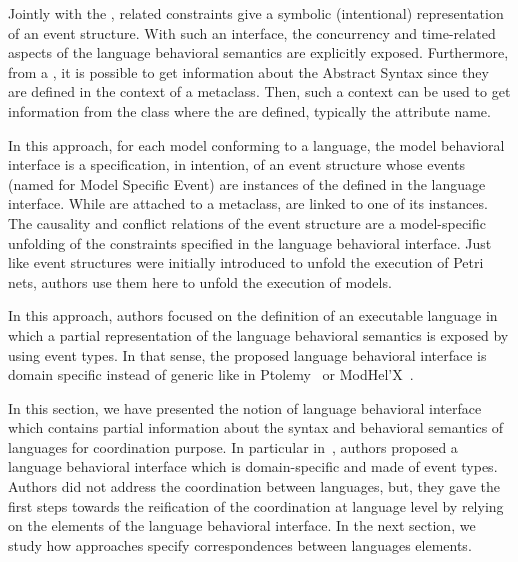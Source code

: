 Jointly with the \dse, related constraints give a symbolic (intentional) representation of an event structure. With such an interface, the concurrency and time-related aspects of the language behavioral semantics are explicitly exposed. Furthermore, from a \dse, it is possible to get information about the Abstract Syntax since they are defined in the context of a metaclass. Then, such a context can be used to get information from the class where the \dse are defined, typically the attribute name.   

In this approach, for each model conforming to a language, the model behavioral interface is a specification, in intention, of an event structure whose events (named \mse for Model Specific Event) are instances of the \dse defined in the language interface. While \dse are attached to a metaclass, \mse are linked to one of its instances. The causality and conflict relations of the event structure are a model-specific unfolding of the constraints specified in the language behavioral interface. Just like event structures were initially introduced to unfold the execution of Petri nets, authors use them here to unfold the execution of models. 

In this approach, authors focused on the definition of an executable language in which a partial representation of the language behavioral semantics is exposed by using event types. In that sense, the proposed language behavioral interface is domain specific instead of generic like in Ptolemy~\cite{ptoleframebib} or ModHel'X~\cite{modhelxbib}. 

In this section, we have presented the notion of language behavioral interface which contains partial information about the syntax and behavioral semantics of languages for coordination purpose. In particular in~\cite{sle13-combemale}, authors proposed a language behavioral interface which is domain-specific and made of event types. Authors did not address the coordination between languages, but, they gave the first steps towards the reification of the coordination at language level by relying on the elements of the language behavioral interface. In the next section, we study how approaches specify correspondences between languages elements.	

	    	
	    	
	    				
